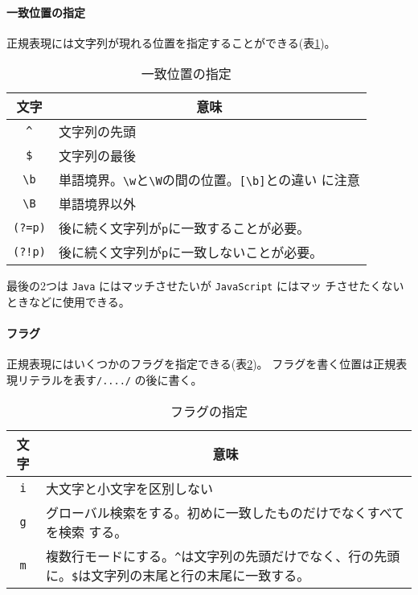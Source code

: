 \paragraph{一致位置の指定}
正規表現には文字列が現れる位置を指定することができる(表\ref{position})。
\begin{table}[ht]
\caption{一致位置の指定}\label{position}
\begin{center}
 \begin{tabular}{|c|l|}\hline
  文字&\multicolumn{1}{c|}{意味}\\\hline
\Verb+^+&文字列の先頭\\\hline
\Verb+$+&文字列の最後\\\hline
\Verb+\b+&単語境界。\Verb+\w+と\Verb+\W+の間の位置。\Verb+[\b]+との違い
      に注意\\\hline
\Verb+\B+&単語境界以外\\\hline
\Verb+(?=p)+&後に続く文字列が\Verb+p+に一致することが必要。\\\hline
\Verb+(?!p)+&後に続く文字列が\Verb+p+に一致しないことが必要。\\\hline
\end{tabular}
\end{center}
\end{table}

最後の2つは \Verb+Java+ にはマッチさせたいが \Verb+JavaScript+ にはマッ
チさせたくないときなどに使用できる。
\paragraph{フラグ}
正規表現にはいくつかのフラグを指定できる(表\ref{flag})。
フラグを書く位置は正規表現リテラルを表す\Verb+/..../+ の後に書く。
\begin{table}[ht]
\caption{フラグの指定}\label{flag}
\begin{center}
 \begin{tabular}{|c|m{}|}\hline
  文字&\multicolumn{1}{c|}{意味}\\\hline
\Verb+i+&大文字と小文字を区別しない\\\hline
\Verb+g+&グローバル検索をする。初めに一致したものだけでなくすべてを検索
      する。\\\hline
\Verb+m+&複数行モードにする。\Verb+^+は文字列の先頭だけでなく、行の先頭
      に。\Verb+$+は文字列の末尾と行の末尾に一致する。\\\hline
\end{tabular}
\end{center}
\end{table}

